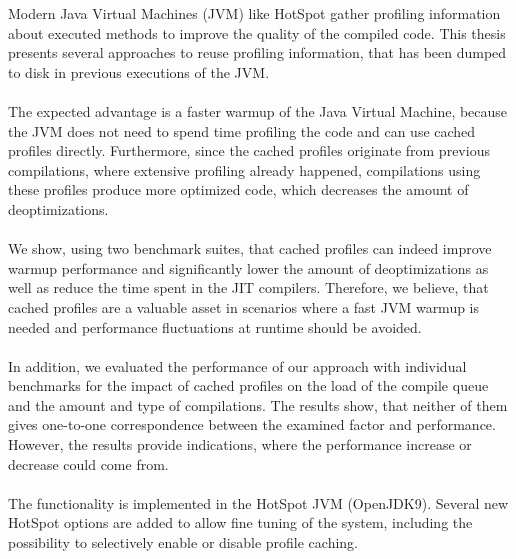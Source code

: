 Modern Java Virtual Machines (JVM) like HotSpot gather profiling information about executed methods to improve the quality of the compiled code.
This thesis presents several approaches to reuse profiling information, that has been dumped to disk in previous executions of the JVM.
\\\\
The expected advantage is a faster warmup of the Java Virtual Machine, because the JVM does not need to spend time profiling the code and can use cached profiles directly.
Furthermore, since the cached profiles originate from previous compilations, where extensive profiling already happened, compilations using these profiles produce more optimized code, which decreases the amount of deoptimizations.
\\\\
We show, using two benchmark suites, that cached profiles can indeed improve warmup performance and significantly lower the amount of deoptimizations as well as reduce the time spent in the JIT compilers.
Therefore, we believe, that cached profiles are a valuable asset in scenarios where a fast JVM warmup is needed and performance fluctuations at runtime should be avoided.
\\\\
In addition, we evaluated the performance of our approach with individual benchmarks for the impact of cached profiles on the load of the compile queue and the amount and type of compilations. The results show, that neither of them gives one-to-one correspondence between the examined factor and performance. However, the results provide indications, where the performance increase or decrease could come from.
\\\\
The functionality is implemented in the HotSpot JVM (OpenJDK9). Several new HotSpot options are added to allow fine tuning of the system, including the possibility to selectively enable or disable profile caching.
